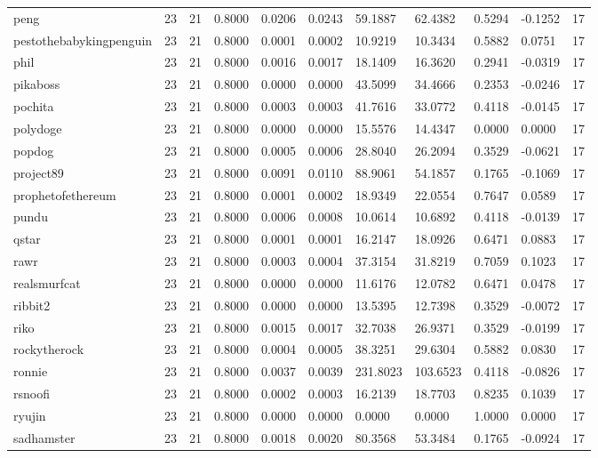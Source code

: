 \begin{table}[htbp]
\begin{tabular}{lllllllllll}
peng & 23 & 21 & 0.8000 & 0.0206 & 0.0243 & 59.1887 & 62.4382 & 0.5294 & -0.1252 & 17 \\
pestothebabykingpenguin & 23 & 21 & 0.8000 & 0.0001 & 0.0002 & 10.9219 & 10.3434 & 0.5882 & 0.0751 & 17 \\
phil & 23 & 21 & 0.8000 & 0.0016 & 0.0017 & 18.1409 & 16.3620 & 0.2941 & -0.0319 & 17 \\
pikaboss & 23 & 21 & 0.8000 & 0.0000 & 0.0000 & 43.5099 & 34.4666 & 0.2353 & -0.0246 & 17 \\
pochita & 23 & 21 & 0.8000 & 0.0003 & 0.0003 & 41.7616 & 33.0772 & 0.4118 & -0.0145 & 17 \\
polydoge & 23 & 21 & 0.8000 & 0.0000 & 0.0000 & 15.5576 & 14.4347 & 0.0000 & 0.0000 & 17 \\
popdog & 23 & 21 & 0.8000 & 0.0005 & 0.0006 & 28.8040 & 26.2094 & 0.3529 & -0.0621 & 17 \\
project89 & 23 & 21 & 0.8000 & 0.0091 & 0.0110 & 88.9061 & 54.1857 & 0.1765 & -0.1069 & 17 \\
prophetofethereum & 23 & 21 & 0.8000 & 0.0001 & 0.0002 & 18.9349 & 22.0554 & 0.7647 & 0.0589 & 17 \\
pundu & 23 & 21 & 0.8000 & 0.0006 & 0.0008 & 10.0614 & 10.6892 & 0.4118 & -0.0139 & 17 \\
qstar & 23 & 21 & 0.8000 & 0.0001 & 0.0001 & 16.2147 & 18.0926 & 0.6471 & 0.0883 & 17 \\
rawr & 23 & 21 & 0.8000 & 0.0003 & 0.0004 & 37.3154 & 31.8219 & 0.7059 & 0.1023 & 17 \\
realsmurfcat & 23 & 21 & 0.8000 & 0.0000 & 0.0000 & 11.6176 & 12.0782 & 0.6471 & 0.0478 & 17 \\
ribbit2 & 23 & 21 & 0.8000 & 0.0000 & 0.0000 & 13.5395 & 12.7398 & 0.3529 & -0.0072 & 17 \\
riko & 23 & 21 & 0.8000 & 0.0015 & 0.0017 & 32.7038 & 26.9371 & 0.3529 & -0.0199 & 17 \\
rockytherock & 23 & 21 & 0.8000 & 0.0004 & 0.0005 & 38.3251 & 29.6304 & 0.5882 & 0.0830 & 17 \\
ronnie & 23 & 21 & 0.8000 & 0.0037 & 0.0039 & 231.8023 & 103.6523 & 0.4118 & -0.0826 & 17 \\
rsnoofi & 23 & 21 & 0.8000 & 0.0002 & 0.0003 & 16.2139 & 18.7703 & 0.8235 & 0.1039 & 17 \\
ryujin & 23 & 21 & 0.8000 & 0.0000 & 0.0000 & 0.0000 & 0.0000 & 1.0000 & 0.0000 & 17 \\
sadhamster & 23 & 21 & 0.8000 & 0.0018 & 0.0020 & 80.3568 & 53.3484 & 0.1765 & -0.0924 & 17 \\

\end{tabular}
\end{table}
